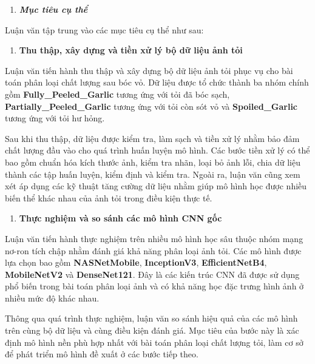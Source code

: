 \documentclass[
]{article}
\begin{document}
\begin{enumerate}
\def\labelenumi{\arabic{enumi}.}
\setcounter{enumi}{1}
\item
  \protect{}\label{_Toc232111983}{}\emph{\textbf{Mục tiêu
  cụ thể}}
\end{enumerate}

Luận văn tập trung vào các mục tiêu cụ thể như sau:

\begin{enumerate}
\def\labelenumi{\alph{enumi}.}
\item
  \textbf{Thu thập, xây dựng và tiền xử lý bộ dữ liệu ảnh tỏi}
\end{enumerate}

Luận văn tiến hành thu thập và xây dựng bộ dữ liệu ảnh tỏi phục vụ cho
bài toán phân loại chất lượng sau bóc vỏ. Dữ liệu được tổ chức thành ba
nhóm chính gồm \textbf{Fully\_Peeled\_Garlic} tương ứng với tỏi đã bóc
sạch, \textbf{Partially\_Peeled\_Garlic} tương ứng với tỏi còn sót vỏ và
\textbf{Spoiled\_Garlic} tương ứng với tỏi hư hỏng.

Sau khi thu thập, dữ liệu được kiểm tra, làm sạch và tiền xử lý nhằm bảo
đảm chất lượng đầu vào cho quá trình huấn luyện mô hình. Các bước tiền
xử lý có thể bao gồm chuẩn hóa kích thước ảnh, kiểm tra nhãn, loại bỏ
ảnh lỗi, chia dữ liệu thành các tập huấn luyện, kiểm định và kiểm tra.
Ngoài ra, luận văn cũng xem xét áp dụng các kỹ thuật tăng cường dữ liệu
nhằm giúp mô hình học được nhiều biến thể khác nhau của ảnh tỏi trong
điều kiện thực tế.

\begin{enumerate}
\def\labelenumi{\alph{enumi}.}
\setcounter{enumi}{1}
\item
  \textbf{Thực nghiệm và so sánh các mô hình CNN gốc}
\end{enumerate}

Luận văn tiến hành thực nghiệm trên nhiều mô hình học sâu thuộc nhóm
mạng nơ-ron tích chập nhằm đánh giá khả năng phân loại ảnh tỏi. Các mô
hình được lựa chọn bao gồm \textbf{NASNetMobile}, \textbf{InceptionV3},
\textbf{EfficientNetB4}, \textbf{MobileNetV2} và \textbf{DenseNet121}.
Đây là các kiến trúc CNN đã được sử dụng phổ biến trong bài toán phân
loại ảnh và có khả năng học đặc trưng hình ảnh ở nhiều mức độ khác nhau.

Thông qua quá trình thực nghiệm, luận văn so sánh hiệu quả của các mô
hình trên cùng bộ dữ liệu và cùng điều kiện đánh giá. Mục tiêu của bước
này là xác định mô hình nền phù hợp nhất với bài toán phân loại chất
lượng tỏi, làm cơ sở để phát triển mô hình đề xuất ở các bước tiếp theo.
\end{document}
